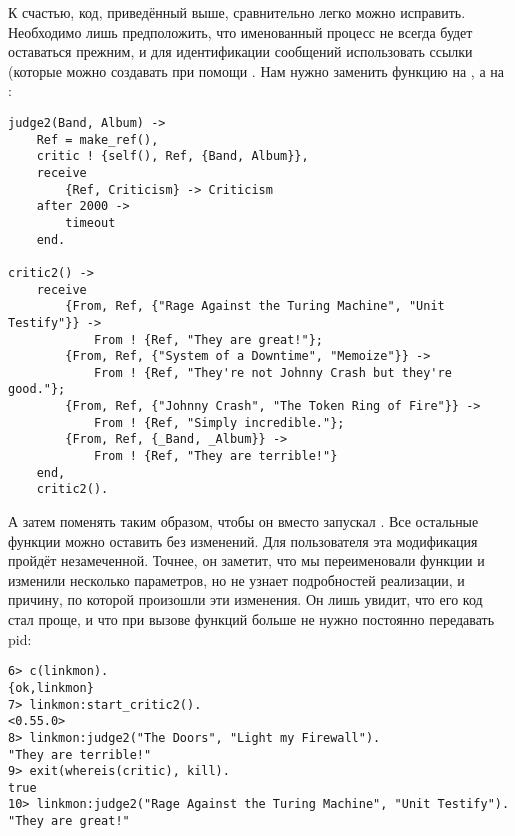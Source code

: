 К счастью, код, приведённый выше, сравнительно легко можно исправить.
Необходимо лишь предположить, что именованный процесс не всегда будет оставаться прежним, и для идентификации сообщений использовать ссылки (которые можно создавать при помощи .
Нам нужно заменить функцию  на , а  на :
\begin{lstlisting}[style=erlang]
judge2(Band, Album) ->
    Ref = make_ref(),
    critic ! {self(), Ref, {Band, Album}},
    receive
        {Ref, Criticism} -> Criticism
    after 2000 ->
        timeout
    end.
 
critic2() ->
    receive
        {From, Ref, {"Rage Against the Turing Machine", "Unit Testify"}} ->
            From ! {Ref, "They are great!"};
        {From, Ref, {"System of a Downtime", "Memoize"}} ->
            From ! {Ref, "They're not Johnny Crash but they're good."};
        {From, Ref, {"Johnny Crash", "The Token Ring of Fire"}} ->
            From ! {Ref, "Simply incredible."};
        {From, Ref, {_Band, _Album}} ->
            From ! {Ref, "They are terrible!"}
    end,
    critic2().
\end{lstlisting}

А затем поменять  таким образом, чтобы он вместо  запускал .
Все остальные функции можно оставить без изменений.
Для пользователя эта модификация пройдёт незамеченной.
Точнее, он заметит, что мы переименовали функции и изменили несколько параметров, но не узнает подробностей реализации, и причину, по которой произошли эти изменения.
Он лишь увидит, что его код стал проще, и что при вызове функций больше не нужно постоянно передавать pid:
\begin{lstlisting}[style=erlang]
6> c(linkmon).
{ok,linkmon}
7> linkmon:start_critic2().
<0.55.0>
8> linkmon:judge2("The Doors", "Light my Firewall").
"They are terrible!"
9> exit(whereis(critic), kill).
true
10> linkmon:judge2("Rage Against the Turing Machine", "Unit Testify").    
"They are great!"
\end{lstlisting}


